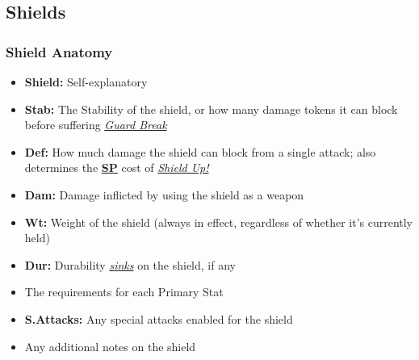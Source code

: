 \documentclass[12pt]{article}
\newcommand{\refto}[1]{\hyperlink{#1}{\textbf{#1}}}
\newcommand{\reftoit}[1]{\hyperlink{#1}{\emph{#1}}}
\begin{document}
\pagebreak

\subsection{Shields}
\subsubsection*{Shield Anatomy}
\begin{itemize}
\item \textbf{Shield:} Self-explanatory
\item \textbf{Stab:} The Stability of the shield, or how many damage tokens it can block before suffering \reftoit{Guard Break}
\item \textbf{Def:} How much damage the shield can block from a single attack; also determines the \refto{SP} cost of \reftoit{Shield Up!}
\item \textbf{Dam:} Damage inflicted by using the shield as a weapon
\item \textbf{Wt:} Weight of the shield (always in effect, regardless of whether it’s currently held)
\item \textbf{Dur:} Durability \reftoit{sinks} on the shield, if any
\item The requirements for each Primary Stat
\item \textbf{S.Attacks:} Any special attacks enabled for the shield
\item Any additional notes on the shield
\end{itemize}
\end{document}

